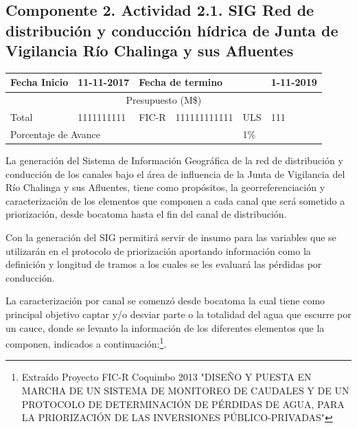 \documentclass[]{article}
\let\rmarkdownfootnote\footnote%
\def\footnote{\protect\rmarkdownfootnote}
\begin{document}
\subsection{Componente 2. Actividad 2.1. SIG Red de distribución y conducción hídrica de Junta de Vigilancia Río Chalinga y sus Afluentes}


\begin{table}[H]
\label{my-label}
\begin{tabular}{|l|l|l|l|l|l|}
\hline
Fecha Inicio & 11-11-2017 & \multicolumn{3}{l|}{Fecha de termino}    & 1-11-2019    \\ \hline
\multicolumn{6}{|c|}{Presupuesto (M\$)}                                             \\ \hline
Total        & 1111111111 & FIC-R     & 111111111111     & ULS       & 111          \\ \hline
\multicolumn{4}{|l|}{Porcentaje de Avance}               & \multicolumn{2}{l|}{1\%} \\ \hline
\end{tabular}
\end{table}

La generación del Sistema de Información Geográfica de la red de distribución y conducción de los canales bajo el área de influencia de la Junta de Vigilancia del Río Chalinga y sus Afluentes, tiene como propósitos, la georreferenciación y caracterización de los elementos que componen a cada canal que será sometido a priorización, desde bocatoma hasta el fin del canal de distribución.

Con la generación del SIG permitirá servir de insumo para las variables que se utilizarán en el protocolo de priorización aportando información como la definición y longitud de tramos a los cuales se les evaluará las pérdidas por conducción. 

La caracterización por canal se comenzó desde bocatoma la cual tiene como principal objetivo captar y/o desviar parte o la totalidad del agua que escurre por un cauce, donde se levanto la información de los diferentes elementos que la componen, indicados a continuación:\footnote{Extraído Proyecto FIC-R Coquimbo 2013 "DISEÑO Y PUESTA EN MARCHA DE UN SISTEMA DE MONITOREO DE CAUDALES Y DE UN PROTOCOLO DE DETERMINACIÓN DE PÉRDIDAS DE AGUA, PARA LA PRIORIZACIÓN DE LAS INVERSIONES PÚBLICO-PRIVADAS" }.
\end{document}

